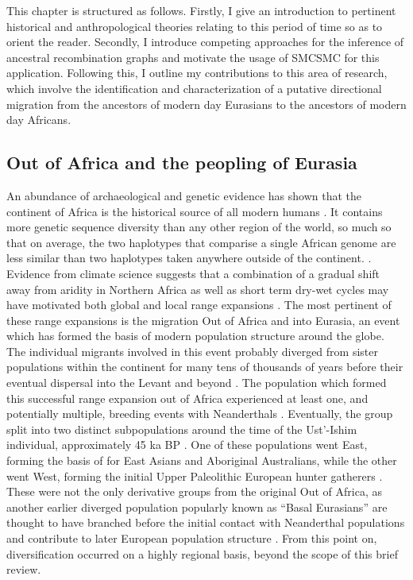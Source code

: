 This chapter is structured as follows. Firstly, I give an introduction to pertinent historical and anthropological theories relating to this period of time so as to orient the reader. Secondly, I introduce competing approaches for the inference of ancestral recombination graphs and motivate the usage of SMCSMC for this application. Following this, I outline my contributions to this area of research, which involve the identification and characterization of a putative directional migration from the ancestors of modern day Eurasians to the ancestors of modern day Africans. 


\subsection{Out of Africa and the peopling of Eurasia}

An abundance of archaeological and genetic evidence has shown that the continent of Africa is the historical source of all modern humans \cite{Lopez2015}. It contains more genetic sequence diversity than any other region of the world, so much so that on average, the two haplotypes that comparise a single African genome are less similar than two haplotypes taken anywhere outside of the continent. \cite{Mallick2016}. Evidence from climate science suggests that a combination of a gradual shift away from aridity in Northern Africa as well as short term dry-wet cycles may have motivated both global and local range expansions \cite{Schaebitz2021, Timmermann2016}. The most pertinent of these range expansions is the migration Out of Africa and into Eurasia, an event which has formed the basis of modern population structure around the globe. 
The individual migrants involved in this event probably diverged from sister populations within the continent for many tens of thousands of years before their eventual dispersal into the Levant and beyond \cite{Bergstrom2019, Schiffels2014}. The population which formed this successful range expansion out of Africa experienced at least one, and potentially multiple, breeding events with Neanderthals \cite{Sankararaman2012}. Eventually, the group split into two distinct subpopulations around the time of the Ust'-Ishim individual, approximately 45 ka BP \cite{Fu2014}. One of these populations went East, forming the basis of for East Asians and Aboriginal Australians, while the other went West, forming the initial Upper Paleolithic European hunter gatherers \cite{Skoglund2017,Lipson2017}. These were not the only derivative groups from the original Out of Africa, as another earlier diverged population popularly known as ``Basal Eurasians'' are thought to have branched before the initial contact with Neanderthal populations and contribute to later European population structure \cite{Lazaridis2014}. From this point on, diversification occurred on a highly regional basis, beyond the scope of this brief review. 

